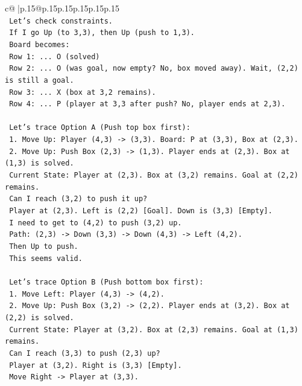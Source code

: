\documentclass{article}
\begin{document}
{\begin{supertabular}{c@{$\;$}|p{.15\linewidth}@{}p{.15\linewidth}p{.15\linewidth}p{.15\linewidth}p{.15\linewidth}p{.15\linewidth}}
{{{\\ 
\texttt{   Let's check constraints.} \\
\texttt{   If I go Up (to 3,3), then Up (push to 1,3).} \\
\texttt{   Board becomes:} \\
\texttt{   Row 1: ... O (solved)} \\
\texttt{   Row 2: ... O (was goal, now empty? No, box moved away). Wait, (2,2) is still a goal.} \\
\texttt{   Row 3: ... X (box at 3,2 remains).} \\
\texttt{   Row 4: ... P (player at 3,3 after push? No, player ends at 2,3).} \\
\\ 
\texttt{   Let's trace Option A (Push top box first):} \\
\texttt{   1. Move Up: Player (4,3) {-}> (3,3). Board: P at (3,3), Box at (2,3).} \\
\texttt{   2. Move Up: Push Box (2,3) {-}> (1,3). Player ends at (2,3). Box at (1,3) is solved.} \\
\texttt{      Current State: Player at (2,3). Box at (3,2) remains. Goal at (2,2) remains.} \\
\texttt{      Can I reach (3,2) to push it up?} \\
\texttt{      Player at (2,3). Left is (2,2) {[}Goal{]}. Down is (3,3) {[}Empty{]}.} \\
\texttt{      I need to get to (4,2) to push (3,2) up.} \\
\texttt{      Path: (2,3) {-}> Down (3,3) {-}> Down (4,3) {-}> Left (4,2).} \\
\texttt{      Then Up to push.} \\
\texttt{      This seems valid.} \\
\\ 
\texttt{   Let's trace Option B (Push bottom box first):} \\
\texttt{   1. Move Left: Player (4,3) {-}> (4,2).} \\
\texttt{   2. Move Up: Push Box (3,2) {-}> (2,2). Player ends at (3,2). Box at (2,2) is solved.} \\
\texttt{      Current State: Player at (3,2). Box at (2,3) remains. Goal at (1,3) remains.} \\
\texttt{      Can I reach (3,3) to push (2,3) up?} \\
\texttt{      Player at (3,2). Right is (3,3) {[}Empty{]}.} \\
\texttt{      Move Right {-}> Player at (3,3).} \\
}}}
\end{supertabular}}
\end{document}
